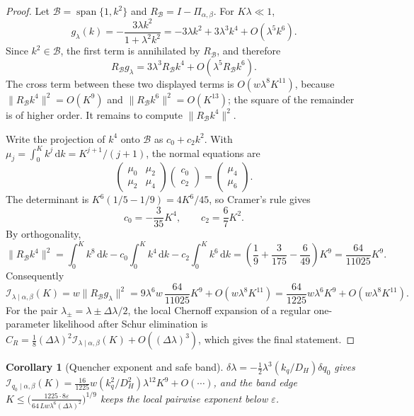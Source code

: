 \documentclass[11pt]{article}
\newtheorem{corollary}{Corollary}
\newcommand{\dd}{\mathrm{d}}
\newcommand{\eps}{\varepsilon}
\newcommand{\calB}{\mathcal B}
\newcommand{\calI}{\mathcal I}
\begin{document}
\begin{proof}
Let \(\calB=\operatorname{span}\{1,k^2\}\) and \(R_\calB=I-\Pi_{\alpha,\beta}\). For \(K\lambda\ll1\),
\[
g_\lambda(k)=-\frac{3\lambda k^2}{1+\lambda^2k^2}
=-3\lambda k^2+3\lambda^3k^4+O(\lambda^5k^6).
\]
Since \(k^2\in\calB\), the first term is annihilated by \(R_\calB\), and therefore
\[
R_\calB g_\lambda=3\lambda^3R_\calB k^4+O(\lambda^5R_\calB k^6).
\]
The cross term between these two displayed terms is \(O(w\lambda^8K^{11})\), because \(\|R_\calB k^4\|^2=O(K^9)\) and \(\|R_\calB k^6\|^2=O(K^{13})\); the square of the remainder is of higher order. It remains to compute \(\|R_\calB k^4\|^2\).

Write the projection of \(k^4\) onto \(\calB\) as \(c_0+c_2k^2\). With \(\mu_j=\int_0^Kk^j\,\dd k=K^{j+1}/(j+1)\), the normal equations are
\[
\begin{pmatrix}
\mu_0&\mu_2\\
\mu_2&\mu_4
\end{pmatrix}
\begin{pmatrix}c_0\\c_2\end{pmatrix}
=
\begin{pmatrix}\mu_4\\\mu_6\end{pmatrix}.
\]
The determinant is \(K^6(1/5-1/9)=4K^6/45\), so Cramer's rule gives
\[
c_0=-\frac{3}{35}K^4,\qquad c_2=\frac67K^2 .
\]
By orthogonality,
\[
\|R_\calB k^4\|^2
=\int_0^Kk^8\,\dd k-c_0\int_0^Kk^4\,\dd k-c_2\int_0^Kk^6\,\dd k
=\left(\frac19+\frac{3}{175}-\frac{6}{49}\right)K^9
=\frac{64}{11025}K^9 .
\]
Consequently
\[
\calI_{\lambda\mid\alpha,\beta}(K)
=w\|R_\calB g_\lambda\|^2
=9\lambda^6w\,\frac{64}{11025}K^9+O(w\lambda^8K^{11})
=\frac{64}{1225}w\lambda^6K^9+O(w\lambda^8K^{11}).
\]
For the pair \(\lambda_\pm=\lambda\pm\Delta\lambda/2\), the local Chernoff expansion of a regular one-parameter likelihood after Schur elimination is \(C_R=\tfrac18(\Delta\lambda)^2\calI_{\lambda\mid\alpha,\beta}(K)+O((\Delta\lambda)^3)\), which gives the final statement.
\end{proof}

\begin{corollary}[Quencher exponent and safe band]
\label{cor:qbit}
\(\delta\lambda=-\tfrac12\lambda^3(k_q/D_H)\delta q_0\) gives \(\calI_{q_0\mid\alpha,\beta}(K)=\tfrac{16}{1225}w(k_q^2/D_H^2)\lambda^{12}K^9+O(\cdots)\), and the band edge \(K\le\big(\tfrac{1225\cdot8\eps}{64\,Lw\lambda^6(\Delta\lambda)^2}\big)^{1/9}\) keeps the local pairwise exponent below \(\eps\).
\end{corollary}
\end{document}
